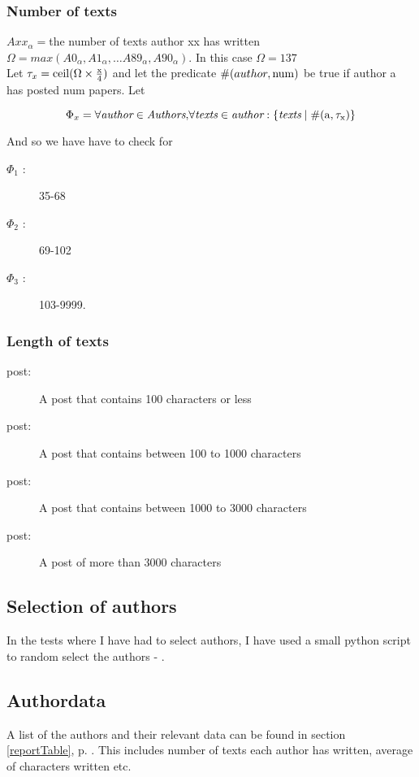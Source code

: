 \subsubsection*{Number of texts}
$Axx_{\alpha} = $the number of texts author xx has written\\ 
$\Omega = max(A0_\alpha, A1_\alpha, \ldots A89_\alpha, A90_\alpha)$. In this case $\Omega = 137$\\

Let $\tau_x = \rm{ceil}(\Omega \times \frac{x}{4})$ and let the predicate $\#(author, \rm{num})$ be true if author a has posted num papers. Let 

$$\Phi_x = \forall\rm{\rm{\emph{author}} }\in\rm{\emph{Authors}, }\forall\rm{\emph{texts} }\in\rm{\emph{author} }: \{\rm{\emph{texts} }\mid \#(a, \tau_x)\}$$ 
 
And so we have have to check for 
\begin{description}
\item[$\Phi_1$ :] 35-68
\item[$\Phi_2$ :] 69-102
\item[$\Phi_3$ :] 103-9999.
\end{description}

\subsubsection*{Length of texts}

\begin{description}
\item[ post:] A post that contains 100 characters or less
\item[ post:] A post that contains between 100 to 1000 characters
\item[ post:] A post that contains between 1000 to 3000 characters
\item[ post:] A post of more than 3000 characters
\end{description}

\subsection{Selection of authors}
In the tests where I have had to select authors, I have used a small python script to random select the authors - .

\subsection{Authordata}
A list of the authors and their relevant data can be found in section \ref{reportTable}, p. \pageref{reportTable}. This includes number of texts each author has written, average of characters written etc.

